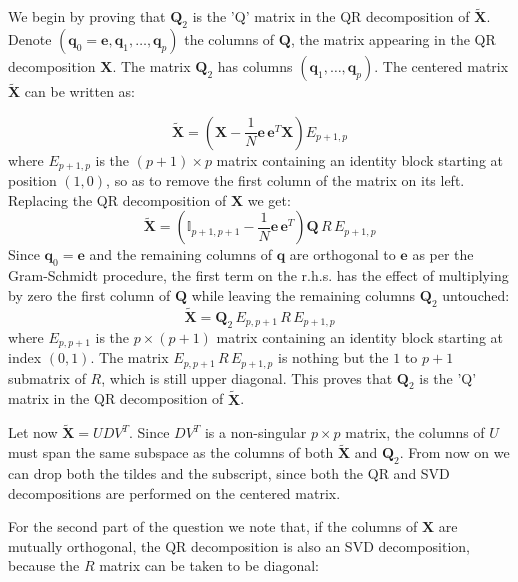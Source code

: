We begin by proving that $\mathbf{Q}_2$ is the 'Q' matrix in
the QR decomposition of $\tilde{\mathbf{X}}$.
Denote $(\mathbf{q}_0 = \mathbf{e}, \mathbf{q}_1, \ldots, \mathbf{q}_p)$ the 
columns of $\mathbf{Q}$, the matrix appearing in the QR decomposition $\mathbf{X}$. The matrix $\mathbf{Q}_2$ has columns $(\mathbf{q}_1, \ldots, 
\mathbf{q}_{p})$. The centered matrix $\tilde{\mathbf{X}}$ can be written as:

\begin{equation}
\tilde{\mathbf{X}} = \left(\mathbf{X} - \frac{1}{N} \mathbf{e}\, \mathbf{e}^T\mathbf{X}\right) E_{p+1, p}
\end{equation}
where $E_{p + 1, p}$ is the $(p + 1) \times p$ matrix containing
an identity block starting at position $(1, 0)$, so as to remove
the first column of the matrix on its left.
Replacing the QR decomposition of $\mathbf{X}$ we get:
\begin{equation}
\tilde{\mathbf{X}} = \left(\mathbb{I}_{p+1, p + 1} - \frac{1}{N} \mathbf{e}\,\mathbf{e}^T\right) \mathbf{Q}\,R\, E_{p+1, p}
\end{equation}
Since $\mathbf{q}_0 = \mathbf{e}$ and the remaining columns of $\mathbf{q}$
are orthogonal to $\mathbf{e}$ as per the Gram-Schmidt procedure, the first
term on the r.h.s. has the effect of multiplying by zero the first column of
$\mathbf{Q}$ while leaving the remaining columns $\mathbf{Q}_2$ untouched:
\begin{equation}
\tilde{\mathbf{X}} = \mathbf{Q}_2\, E_{p, p+1} \,R\, E_{p+1, p}
\end{equation}
where $E_{p, p+1}$ is the $p \times (p + 1)$ matrix containing an identity
block starting at index $(0, 1)$. The matrix $E_{p, p+1} \,R\, E_{p+1, p}$
is nothing but the $1$ to $p + 1$ submatrix of $R$, which is still upper diagonal.
This proves that $\mathbf{Q}_2$ is the 'Q' matrix in the QR decomposition of
$\tilde{\mathbf{X}}$.

Let now $\tilde{\mathbf{X}} = UDV^T$. Since $DV^T$ is a non-singular $p \times p$
matrix, the columns of $U$ must span the same subspace as the columns of both
$\tilde{\mathbf{X}}$ and $\mathbf{Q}_2$. From now on we can drop both the tildes
and the subscript, since both the QR and SVD decompositions are performed
on the centered matrix.

For the second part of the question we note that, if the columns of 
$\mathbf{X}$ are mutually orthogonal, the QR decomposition is also
an SVD decomposition, because the $R$ matrix can be taken to be diagonal:

